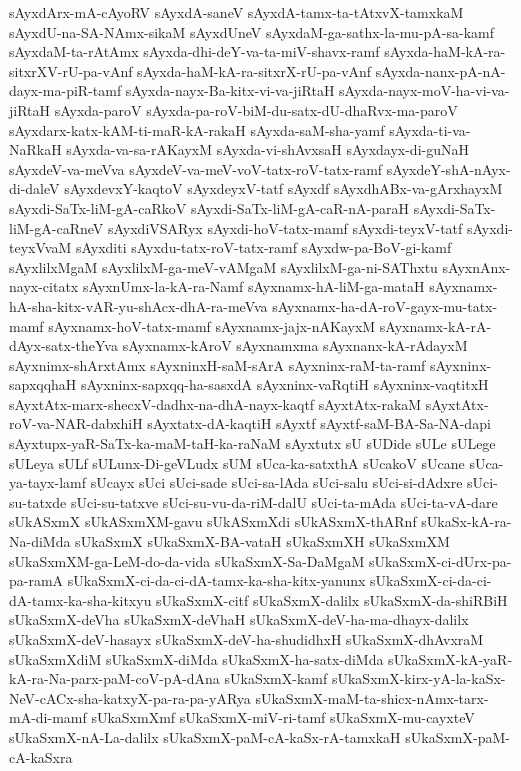 {sAyxdArx-mA-cAyoRV
sAyxdA-saneV
sAyxdA-tamx-ta-tAtxvX-tamxkaM
sAyxdU-na-SA-NAmx-sikaM
sAyxdUneV
sAyxdaM-ga-sathx-la-mu-pA-sa-kamf
sAyxdaM-ta-rAtAmx
sAyxda-dhi-deY-va-ta-miV-shavx-ramf
sAyxda-haM-kA-ra-sitxrXV-rU-pa-vAnf
sAyxda-haM-kA-ra-sitxrX-rU-pa-vAnf
sAyxda-nanx-pA-nA-dayx-ma-piR-tamf
sAyxda-nayx-Ba-kitx-vi-va-jiRtaH
sAyxda-nayx-moV-ha-vi-va-jiRtaH
sAyxda-paroV
sAyxda-pa-roV-biM-du-satx-dU-dhaRvx-ma-paroV
sAyxdarx-katx-kAM-ti-maR-kA-rakaH
sAyxda-saM-sha-yamf
sAyxda-ti-va-NaRkaH
sAyxda-va-sa-rAKayxM
sAyxda-vi-shAvxsaH
sAyxdayx-di-guNaH
sAyxdeV-va-meVva
sAyxdeV-va-meV-voV-tatx-roV-tatx-ramf
sAyxdeY-shA-nAyx-di-daleV
sAyxdevxY-kaqtoV
sAyxdeyxV-tatf
sAyxdf
sAyxdhABx-va-gArxhayxM
sAyxdi-SaTx-liM-gA-caRkoV
sAyxdi-SaTx-liM-gA-caR-nA-paraH
sAyxdi-SaTx-liM-gA-caRneV
sAyxdiVSARyx
sAyxdi-hoV-tatx-mamf
sAyxdi-teyxV-tatf
sAyxdi-teyxVvaM
sAyxditi
sAyxdu-tatx-roV-tatx-ramf
sAyxdw-pa-BoV-gi-kamf
sAyxlilxMgaM
sAyxlilxM-ga-meV-vAMgaM
sAyxlilxM-ga-ni-SAThxtu
sAyxnAnx-nayx-citatx
sAyxnUmx-la-kA-ra-Namf
sAyxnamx-hA-liM-ga-mataH
sAyxnamx-hA-sha-kitx-vAR-yu-shAcx-dhA-ra-meVva
sAyxnamx-ha-dA-roV-gayx-mu-tatx-mamf
sAyxnamx-hoV-tatx-mamf
sAyxnamx-jajx-nAKayxM
sAyxnamx-kA-rA-dAyx-satx-theYva
sAyxnamx-kAroV
sAyxnamxma
sAyxnanx-kA-rAdayxM
sAyxnimx-shArxtAmx
sAyxninxH-saM-sArA
sAyxninx-raM-ta-ramf
sAyxninx-sapxqqhaH
sAyxninx-sapxqq-ha-sasxdA
sAyxninx-vaRqtiH
sAyxninx-vaqtitxH
sAyxtAtx-marx-shecxV-dadhx-na-dhA-nayx-kaqtf
sAyxtAtx-rakaM
sAyxtAtx-roV-va-NAR-dabxhiH
sAyxtatx-dA-kaqtiH
sAyxtf
sAyxtf-saM-BA-Sa-NA-dapi
sAyxtupx-yaR-SaTx-ka-maM-taH-ka-raNaM
sAyxtutx
sU
sUDide
sULe
sULege
sULeya
sULf
sULunx-Di-geVLudx
sUM
sUca-ka-satxthA
sUcakoV
sUcane
sUca-ya-tayx-lamf
sUcayx
sUci
sUci-sade
sUci-sa-lAda
sUci-salu
sUci-si-dAdxre
sUci-su-tatxde
sUci-su-tatxve
sUci-su-vu-da-riM-dalU
sUci-ta-mAda
sUci-ta-vA-dare
sUkASxmX
sUkASxmXM-gavu
sUkASxmXdi
sUkASxmX-thARnf
sUkaSx-kA-ra-Na-diMda
sUkaSxmX
sUkaSxmX-BA-vataH
sUkaSxmXH
sUkaSxmXM
sUkaSxmXM-ga-LeM-do-da-vida
sUkaSxmX-Sa-DaMgaM
sUkaSxmX-ci-dUrx-pa-pa-ramA
sUkaSxmX-ci-da-ci-dA-tamx-ka-sha-kitx-yanunx
sUkaSxmX-ci-da-ci-dA-tamx-ka-sha-kitxyu
sUkaSxmX-citf
sUkaSxmX-dalilx
sUkaSxmX-da-shiRBiH
sUkaSxmX-deVha
sUkaSxmX-deVhaH
sUkaSxmX-deV-ha-ma-dhayx-dalilx
sUkaSxmX-deV-hasayx
sUkaSxmX-deV-ha-shudidhxH
sUkaSxmX-dhAvxraM
sUkaSxmXdiM
sUkaSxmX-diMda
sUkaSxmX-ha-satx-diMda
sUkaSxmX-kA-yaR-kA-ra-Na-parx-paM-coV-pA-dAna
sUkaSxmX-kamf
sUkaSxmX-kirx-yA-la-kaSx-NeV-cACx-sha-katxyX-pa-ra-pa-yARya
sUkaSxmX-maM-ta-shicx-nAmx-tarx-mA-di-mamf
sUkaSxmXmf
sUkaSxmX-miV-ri-tamf
sUkaSxmX-mu-cayxteV
sUkaSxmX-nA-La-dalilx
sUkaSxmX-paM-cA-kaSx-rA-tamxkaH
sUkaSxmX-paM-cA-kaSxra
}
